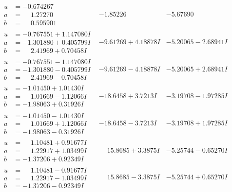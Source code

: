 \documentclass[1p]{elsarticle_modified}
\theoremstyle{definition}
\begin{document}
$$\begin{array}{c|c|c}
\begin{aligned}
u &= -0.674267\phantom{ +0.000000I} \\
a &= \phantom{-}1.27270\phantom{ +0.000000I} \\
b &= \phantom{-}0.595901\phantom{ +0.000000I}\end{aligned}
 & -1.85226\phantom{ +0.000000I} & -5.67690\phantom{ +0.000000I} \\ \hline\begin{aligned}
u &= -0.767551 + 1.147080 I \\
a &= -1.301880 + 0.405799 I \\
b &= \phantom{-}2.41969 + 0.70458 I\end{aligned}
 & -9.61269 + 4.18878 I & -5.20065 - 2.68941 I \\ \hline\begin{aligned}
u &= -0.767551 - 1.147080 I \\
a &= -1.301880 - 0.405799 I \\
b &= \phantom{-}2.41969 - 0.70458 I\end{aligned}
 & -9.61269 - 4.18878 I & -5.20065 + 2.68941 I \\ \hline\begin{aligned}
u &= -1.01450 + 1.01430 I \\
a &= \phantom{-}1.01669 - 1.12066 I \\
b &= -1.98063 + 0.31926 I\end{aligned}
 & -18.6458 + 3.7213 I & -3.19708 - 1.97285 I \\ \hline\begin{aligned}
u &= -1.01450 - 1.01430 I \\
a &= \phantom{-}1.01669 + 1.12066 I \\
b &= -1.98063 - 0.31926 I\end{aligned}
 & -18.6458 - 3.7213 I & -3.19708 + 1.97285 I \\ \hline\begin{aligned}
u &= \phantom{-}1.10481 + 0.91677 I \\
a &= \phantom{-}1.22917 + 1.03499 I \\
b &= -1.37206 + 0.92349 I\end{aligned}
 & \phantom{-}15.8685 + 3.3875 I & -5.25744 - 0.65270 I \\ \hline\begin{aligned}
u &= \phantom{-}1.10481 - 0.91677 I \\
a &= \phantom{-}1.22917 - 1.03499 I \\
b &= -1.37206 - 0.92349 I\end{aligned}
 & \phantom{-}15.8685 - 3.3875 I & -5.25744 + 0.65270 I \\ \hline\begin{aligned}

\end{aligned}
\end{array}$$
\end{document}
